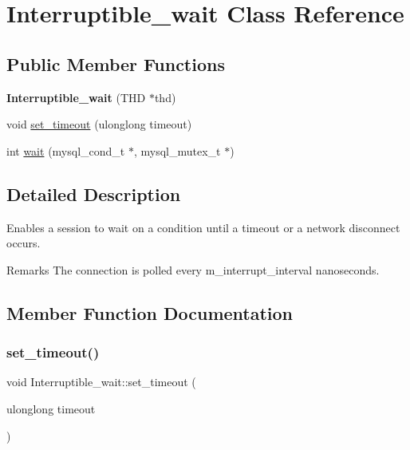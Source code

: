 \hypertarget{classInterruptible__wait}{}\section{Interruptible\+\_\+wait Class Reference}
\label{classInterruptible__wait}
\subsection*{Public Member Functions}
\begin{DoxyCompactItemize}
\item 
\mbox{\label{classInterruptible__wait_ab3538dc34c7b581c2b562cf5b546c633}} 
{\bfseries Interruptible\+\_\+wait} (T\+HD $\ast$thd)
\item 
void \mbox{\hyperlink{classInterruptible__wait_abd3438921a2523eb4e1d9483c8acab28}{set\+\_\+timeout}} (ulonglong timeout)
\item 
int \mbox{\hyperlink{classInterruptible__wait_ae91a46ef68f95f016291b82c101e081e}{wait}} (mysql\+\_\+cond\+\_\+t $\ast$, mysql\+\_\+mutex\+\_\+t $\ast$)
\end{DoxyCompactItemize}


\subsection{Detailed Description}
Enables a session to wait on a condition until a timeout or a network disconnect occurs.

\begin{DoxyRemark}{Remarks}
The connection is polled every m\+\_\+interrupt\+\_\+interval nanoseconds. 
\end{DoxyRemark}


\subsection{Member Function Documentation}
\mbox{\label{classInterruptible__wait_abd3438921a2523eb4e1d9483c8acab28}} 
\subsubsection{\texorpdfstring{set\+\_\+timeout()}{set\_timeout()}}
{\footnotesize\ttfamily void Interruptible\+\_\+wait\+::set\+\_\+timeout (\begin{DoxyParamCaption}\item[{ulonglong}]{timeout }\end{DoxyParamCaption})\hspace{0.3cm}{\ttfamily [inline]}}

